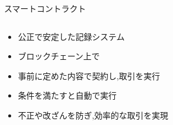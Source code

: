 \documentclass[unicode,12pt,aspectratio=169, dvipdfmx]{beamer}
\begin{document}
    \begin{frame}{スマートコントラクト}
        \begin{columns}
            \begin{column}[T]{.7\linewidth}
                \begin{itemize}
                    \item 公正で安定した記録システム
                    \item ブロックチェーン上で
                    \item 事前に定めた内容で契約し,取引を実行
                    \item 条件を満たすと自動で実行
                    \item 不正や改ざんを防ぎ,効率的な取引を実現
                \end{itemize}
            \end{column}
        \end{columns}
    \end{frame}
\end{document}
